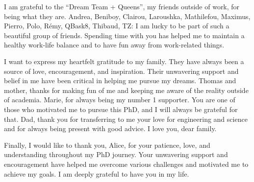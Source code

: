 I am grateful to the ``Dream Team + Queens'', my friends outside of work, for being what they are. Andrea, Beniboy, Clairou, Laroushka, Mathilefou, Maximus, Pierro, Polo, Rémy, QBask8, Thibaud, TZ: I am lucky to be part of such a beautiful group of friends. Spending time with you has helped me to maintain a healthy work-life balance and to have fun away from work-related things.

I want to express my heartfelt gratitude to my family. They have always been a source of love, encouragement, and inspiration. Their unwavering support and belief in me have been critical in helping me pursue my dreams. Thomas and mother, thanks for making fun of me and keeping me aware of the reality outside of academia. Marie, for always being my number 1 supporter. You are one of those who motivated me to pursue this PhD, and I will always be grateful for that. Dad, thank you for transferring to me your love for engineering and science and for always being present with good advice. I love you, dear family.

Finally, I would like to thank you, Alice, for your patience, love, and understanding throughout my PhD journey. Your unwavering support and encouragement have helped me overcome various challenges and motivated me to achieve my goals. I am deeply grateful to have you in my life.
%
%
%
%
%
%
